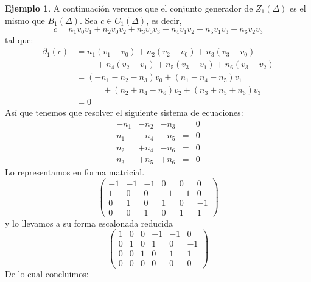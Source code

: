 \documentclass[12pt]{book}
\theoremstyle{definition}
\newtheorem{example}[theorem]{Ejemplo}
\newcounter{in}
\begin{document}
{\begin{example}
  A continuación veremos que el conjunto generador de $Z_{1}(\Delta)$
  es el mismo que $B_{1}(\Delta)$. Sea $c\in C_{1}(\Delta)$, es decir,
 $$c=n_{1}v_{0}v_{1}+n_{2}v_{0}v_{2}+n_{3}v_{0}v_{3}+n_{4}v_{1}v_{2}+n_{5}v_{1}v_{3}+n_{6}v_{2}v_{3}$$
 tal que:
 \begin{align*}
   \partial_{1}(c)&=n_{1}(v_{1}-v_{0})+n_{2}(v_{2}-v_{0})+n_{3}(v_{3}-v_{0})\\
   &\phantom{{}=n_{1}}+n_{4}(v_{2}-v_{1})+n_{5}(v_{3}-v_{1})+n_{6}(v_{3}-v_{2})\\
   &=(-n_{1}-n_{2}-n_{3})v_{0}+(n_{1}-n_{4}-n_{5})v_{1}\\
   &\phantom{{}=-n_{1}}+(n_{2}+n_{4}-n_{6})v_{2}+(n_{3}+n_{5}+n_{6})v_{3}\\
   &=0
 \end{align*}
 Así que tenemos que resolver el siguiente sistema de ecuaciones:
 \[\begin{array}{rrrrr}
   -n_{1} & -n_{2} & -n_{3} & = & 0 \\
   n_{1} & -n_{4} & -n_{5} & = & 0 \\
   n_{2} & +n_{4} & -n_{6} & = & 0 \\
   n_{3} & +n_{5} & +n_{6} & = & 0 
 \end{array}\]
 Lo representamos en forma matricial.
 \[ \left(
   \begin{array}{rrrrrr}
     -1  & -1    & -1   & 0    & 0     & 0 \\
     1   & 0     &    0 & -1   & -1    & 0 \\
     0   & 1     &    0 & 1   & 0    & -1 \\
     0   & 0     &    1 & 0   & 1    & 1 
   \end{array} 
 \right)\]
 y lo llevamos a su forma escalonada reducida
 \[ \left(
   \begin{array}{rrrrrr}
     1     &    0  & 0     & -1    & -1    & 0 \\
     0     &    1  & 0     &  1    & 0     & -1 \\
     0     &    0  & 1     & 0     & 1     & 1 \\
     0     &    0  & 0     & 0     & 0     & 0 
   \end{array} 
 \right)\]
 De lo cual concluimos:
 \[\begin{array}{rrrrr}

\end{array}\]
\end{example}}
\end{document}
